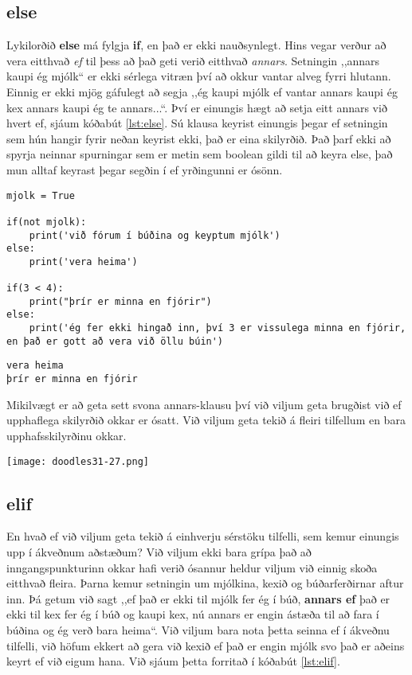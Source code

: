\subsection{else}
Lykilorðið \textbf{else} má fylgja \textbf{if}, en það er ekki nauðsynlegt.
Hins vegar verður að vera eitthvað \emph{ef} til þess að það geti verið eitthvað \emph{annars}.
Setningin ,,annars kaupi ég mjólk“ er ekki sérlega vitræn því að okkur vantar alveg fyrri hlutann.
Einnig er ekki mjög gáfulegt að segja ,,ég kaupi mjólk ef vantar annars kaupi ég kex annars kaupi ég te annars...“.
Því er einungis hægt að setja eitt annars við hvert ef, sjáum kóðabút \ref{lst:else}.
Sú klausa keyrist einungis þegar ef setningin sem hún hangir fyrir neðan keyrist ekki, það er eina skilyrðið.
Það þarf ekki að spyrja neinnar spurningar sem er metin sem boolean gildi til að keyra else, það mun alltaf keyrast þegar segðin í ef yrðingunni er ósönn.

\begin{lstlisting}[caption=else notað, label=lst:else]
mjolk = True

if(not mjolk):
	print('við fórum í búðina og keyptum mjólk')
else:
	print('vera heima')

if(3 < 4):
	print("þrír er minna en fjórir")
else:
	print('ég fer ekki hingað inn, því 3 er vissulega minna en fjórir, en það er gott að vera við öllu búin')
\end{lstlisting}
\lstset{style=uttak}
\begin{lstlisting}
vera heima
þrír er minna en fjórir
\end{lstlisting}
\lstset{style=venjulegt}

Mikilvægt er að geta sett svona annars-klausu því við viljum geta brugðist við ef upphaflega skilyrðið okkar er ósatt.
Við viljum geta tekið á fleiri tilfellum en bara upphafsskilyrðinu okkar.

\begin{center}
	\texttt{[image: doodles31-27.png]}
\end{center}


\subsection{elif}
En hvað ef við viljum geta tekið á einhverju sérstöku tilfelli, sem kemur einungis upp í ákveðnum aðstæðum?
Við viljum ekki bara grípa það að inngangspunkturinn okkar hafi verið ósannur heldur viljum við einnig skoða eitthvað fleira.
Þarna kemur setningin um mjólkina, kexið og búðarferðirnar aftur inn.
Þá getum við sagt ,,ef það er ekki til mjólk fer ég í búð, \textbf{annars ef} það er ekki til kex fer ég í búð og kaupi kex, nú annars er engin ástæða til að fara í búðina og ég verð bara heima“.
Við viljum bara nota þetta seinna ef í ákveðnu tilfelli, við höfum ekkert að gera við kexið ef það er engin mjólk svo það er aðeins keyrt ef við eigum hana.
Við sjáum þetta forritað í kóðabút \ref{lst:elif}.

